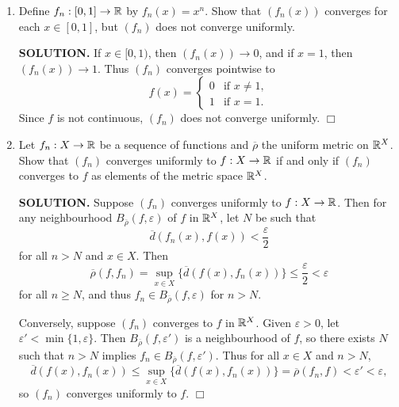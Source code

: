 \documentclass{article}
\begin{document}
\begin{enumerate}
    {\bf SOLUTION.} We know that $x_n \times y_n \rightarrow x \times y$ in $\reals^2$. Then since $+: \reals^2 \rightarrow \reals$ is continuous,
    $$x_n + y_n = (+) \circ (x_n \times y_n) \rightarrow (+) \circ (x \times y) = x+ y.$$
    Similarly, $x_n - y_n \rightarrow x-y$, $x_ny_n \rightarrow xy$, and $\frac{x_n}{y_n} \rightarrow \frac{x}{y}$. $\Box$

    \item Define $f_n:[0, 1]\rightarrow \mathbb{R}$ by $f_n(x) = x^n$. Show that $(f_n(x))$ converges for each $x \in [0, 1]$, but $(f_n)$ does not converge uniformly.

    {\bf SOLUTION.} If $x \in [0, 1)$, then $(f_n(x)) \rightarrow 0$, and if $x = 1$, then $(f_n(x)) \rightarrow 1$. Thus $(f_n)$ converges pointwise to
    $$f(x) = \begin{cases}
        0 &\text{if } x \neq 1, \\
        1 &\text{if } x = 1.
    \end{cases}$$
    Since $f$ is not continuous, $(f_n)$ does not converge uniformly. $\Box$

    \item Let $f_n: X \rightarrow \mathbb{R}$ be a sequence of functions and $\overline{\rho}$ the uniform metric on $\mathbb{R}^X$. Show that $(f_n)$ converges uniformly to $f: X \rightarrow \mathbb{R}$ if and only if $(f_n)$ converges to $f$ as elements of the metric space $\mathbb{R}^X$.

    {\bf SOLUTION.} Suppose $(f_n)$ converges uniformly to $f: X \rightarrow \mathbb{R}$. Then for any neighbourhood $B_{\overline{\rho}}(f, \varepsilon)$ of $f$ in $\mathbb{R}^X$, let $N$ be such that
    $$\overline{d}(f_n(x), f(x)) < \frac{\varepsilon}{2}$$
    for all $n > N$ and $x \in X$. Then
    $$\overline{\rho}(f, f_n) = \sup_{x \in X} \{\overline{d}(f(x), f_n(x))\} \leq \frac{\varepsilon}{2} < \varepsilon$$
    for all $n \geq N$, and thus $f_n \in B_{\overline{\rho}}(f, \varepsilon)$ for $n > N$.

    Conversely, suppose $(f_n)$ converges to $f$ in $\mathbb{R}^X$. Given $\varepsilon > 0$, let $\varepsilon' < \min \{1, \varepsilon\}$. Then $B_{\overline{\rho}}(f, \varepsilon')$ is a neighbourhood of $f$, so there exists $N$ such that $n > N$ implies $f_n \in B_{\overline{\rho}}(f, \varepsilon')$. Thus for all $x \in X$ and $n > N$, 
    $$\overline{d}(f(x), f_n(x)) \leq \sup_{x \in X} \{\overline{d}(f(x), f_n(x))\} = \overline{\rho}(f_n, f) < \varepsilon' < \varepsilon,$$
    so $(f_n)$ converges uniformly to $f$. $\Box$


\end{enumerate}
\end{document}
